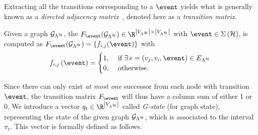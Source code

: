 Extracting all the transitions  corresponding to a  $\event$ yields what is generally known as a \emph{directed adjacency matrix}~\cite{xu2012matrix}, denoted here as a \emph{transition matrix}. 
\begin{definition}
    \label{def:transition}
    Given a graph $\mathcal{G}_{\Lambda^{\mathcal{H}}}$, the  $F_{\event} ( \GG{\Lambda^\strat} ) \in \R^{\abs{\VV{\Lambda^\strat}} \times \abs{\VV{\Lambda^\strat}}}$ with $\event\in\Sigma\left(\strat\right)$, is computed as $F_{\event} ( \GG{\Lambda^\strat} ) = \{f_{i,j}(\event)\}$ with
    \begin{equation*}
        f_{i,j}\funof{\event}=
        \begin{cases}
            1, &\text{ if } \exists \, e=(v_j,v_i,\event) \in \EE{\Lambda^\strat} \\
            0, &\text{ otherwise.}
        \end{cases}
        \end{equation*}%
\end{definition}
%
%
Since there can only exist \emph{at most one} successor from each node with  transition  $\event$, the transition matrix $F_\event$ will thus have a column sum of either 1 or 0.
We introduce a vector $q_t\in \R^{\abs{\VV{\Lambda^\strat}}}$ called \emph{G-state} (for graph state), representing the state of the given graph $\mathcal{G}_{\Lambda^{\mathcal{H}}}$, which is associated to the interval $\pi_t$.
This vector is formally defined as follows.

